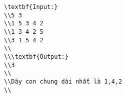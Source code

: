\begin{verbatim}
\textbf{Input:}
\\5 3
\\1 5 3 4 2
\\1 3 4 2 5
\\3 1 5 4 2
\\
\\\textbf{Output:}
\\3
\\
\\Dãy con chung dài nhất là 1,4,2
\\\end{verbatim}